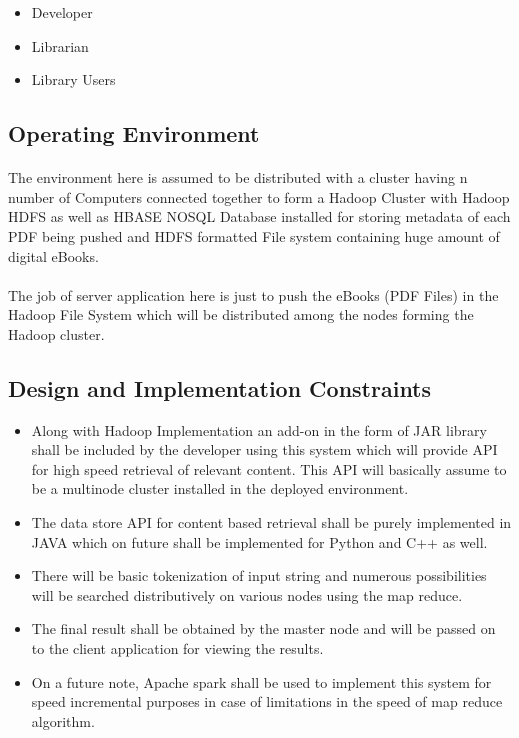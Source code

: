 \documentclass[11pt,letterpaper]{article}
\begin{document}
\begin{itemize}
\item Developer
\item Librarian
\item Library Users
\end{itemize}

\subsection{Operating Environment}

\paragraph{}
The environment here is assumed to be distributed with a cluster having n number of Computers connected together to form a Hadoop Cluster with Hadoop HDFS as well as HBASE NOSQL Database installed for storing metadata of each PDF being pushed and HDFS formatted File system containing huge amount of digital eBooks.

\paragraph{}
The job of server application here is just to push the eBooks (PDF Files) in the Hadoop File System which will be distributed among the nodes forming the Hadoop cluster.

\subsection{Design and Implementation Constraints}

\begin{itemize}
\item Along with Hadoop Implementation an add-on in the form of JAR library shall be included by the developer using this system which will provide API for high speed retrieval of relevant content. This API will basically assume to be a multinode cluster installed in the deployed environment.
\item The data store API for content based retrieval shall be purely implemented in JAVA which on future shall be implemented for Python and C++ as well.
\item There will be basic tokenization of input string and numerous possibilities will be searched distributively on various nodes using the map reduce.
\item The final result shall be obtained by the master node and will be passed on to the client application for viewing the results.
\item On a future note, Apache spark shall be used to implement this system for speed incremental purposes in case of limitations in the speed of map reduce algorithm.
\end{itemize}
\end{document}
